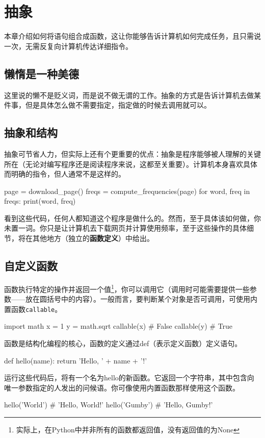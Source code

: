 \chapter{抽象\label{chapter06}}
本章介绍如何将语句组合成函数，这让你能够告诉计算机如何完成任务，且只需说一次，无需反复向计算机传达详细指令。
\section{懒惰是一种美德}
这里说的懒不是贬义词，而是说不做无谓的工作。抽象的方式是告诉计算机去做某件事，但是具体怎么做不需要指定，指定做的时候去调用就可以。

\section{抽象和结构}
抽象可节省人力，但实际上还有个更重要的优点：抽象是程序能够被人理解的关键所在（无论对编写程序还是阅读程序来说，这都至关重要）。计算机本身喜欢具体而明确的指令，但人通常不是这样的。

\begin{pyc}
page = download_page()
freqs = compute_frequencies(page)
for word, freq in freqs:
    print(word, freq)
\end{pyc}
看到这些代码，任何人都知道这个程序是做什么的。然而，至于具体该如何做，你未置一词。你只是让计算机去下载网页并计算使用频率，至于这些操作的具体细节，将在其他地方（独立的\textbf{函数定义}）中给出。

\section{自定义函数}
函数执行特定的操作并返回一个值\footnote{实际上，在Python中并非所有的函数都返回值，没有返回值的为None}，你可以调用它（调用时可能需要提供一些参数------放在圆括号中的内容）。一般而言，要判断某个对象是否可调用，可使用内置函数\verb|callable|。

\begin{pyc}
import math
x = 1
y = math.sqrt
callable(x)  # False
callable(y)  # True
\end{pyc}

函数是结构化编程的核心，函数的定义通过def（表示定义函数）定义语句。
\begin{pyc}
def hello(name):
    return 'Hello, ' + name + '!'
\end{pyc}
运行这些代码后，将有一个名为hello的新函数。它返回一个字符串，其中包含向唯一参数指定的人发出的问候语。你可像使用内置函数那样使用这个函数。

\begin{pyc}
hello('World')  # 'Hello, World!'
hello('Gumby')  # 'Hello, Gumby!'
\end{pyc}
